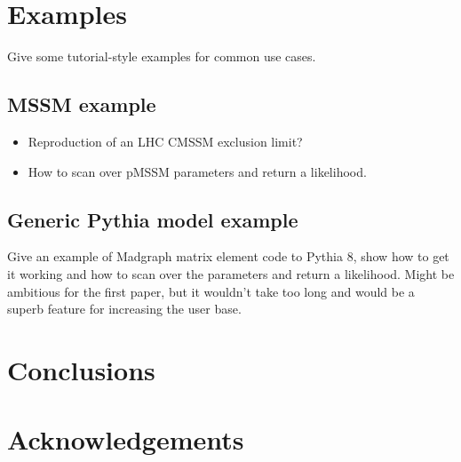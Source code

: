 \documentclass[11pt,a4paper]{article}
\begin{document}
\section{Examples}

Give some tutorial-style examples for common use cases.

\subsection{MSSM example}

\begin{itemize}
\item Reproduction of an LHC CMSSM exclusion limit?
\item How to scan over pMSSM parameters and return a likelihood.

\end{itemize}

\subsection{Generic Pythia model example}

Give an example of Madgraph matrix element code to Pythia 8, show how to get it working and how to scan over the parameters and return a likelihood. Might be ambitious for the first paper, but it wouldn't take too long and would be a superb feature for increasing the user base.

\section{Conclusions}

\section{Acknowledgements}
\end{document}
